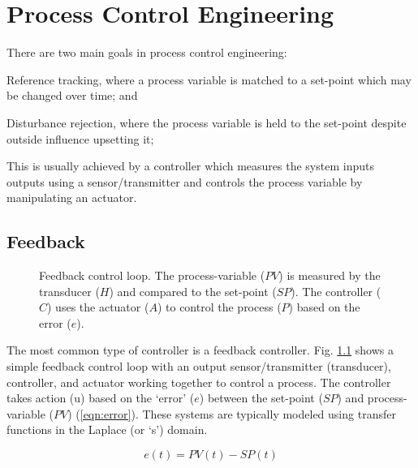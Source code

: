 \chapter{Process Control Engineering}
\label{Chapter:Controls}

There are two main goals in process control engineering:
\begin{enumerate*}
    \item Reference tracking, where a process variable is matched to a set-point which may be changed over time; and 
    \item Disturbance rejection, where the process variable is held to the set-point despite outside influence upsetting it;
\end{enumerate*}
This is usually achieved by a controller which measures the system inputs \andor outputs using a sensor/transmitter and controls the process variable by manipulating an actuator. 

\section{Feedback}
\begin{figure}[!ht]
    \centering
    
    \caption[Feedback control loop]{Feedback control loop. The process-variable ($PV$) is measured by the transducer ($H$) and compared to the set-point ($SP$). The controller ($C$) uses the actuator ($A$) to control the process ($P$) based on the error ($e$).}
    \label{fig:tikz_feedback}
\end{figure}

The most common type of controller is a feedback controller. Fig. \ref{fig:tikz_feedback} shows a simple feedback control loop with an output sensor/transmitter (\ie transducer), controller, and actuator working together to control a process. The controller takes action (u) based on the `error' ($e$) between the set-point ($SP$) and process-variable ($PV$) (\ref{eqn:error}). These systems are typically modeled using transfer functions in the Laplace (or `s') domain.

\begin{equation}\label{eqn:error}
    e(t) = PV(t) - SP(t)
\end{equation}

